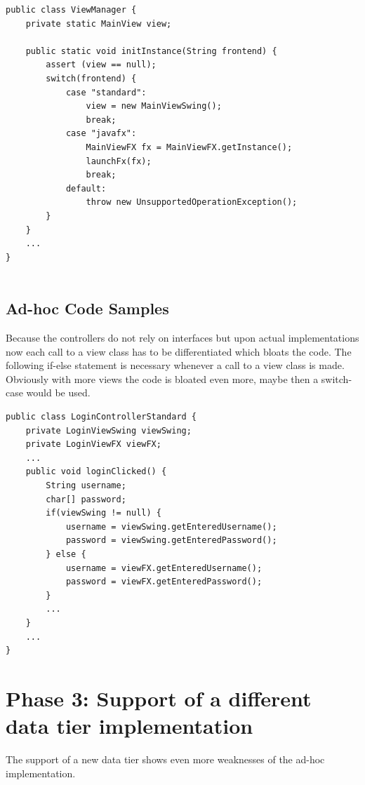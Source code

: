\begin{lstlisting}[caption={View Manager after implementation of a second GUI. Only a case branch has to be added.}, captionpos=b]
public class ViewManager {
	private static MainView view;
	
	public static void initInstance(String frontend) {
		assert (view == null);
		switch(frontend) {
			case "standard":
				view = new MainViewSwing();
				break;
			case "javafx":
				MainViewFX fx = MainViewFX.getInstance();
				launchFx(fx);
				break;
			default:
				throw new UnsupportedOperationException();
		}
	}
	...
}
	
\end{lstlisting}

\subsection{Ad-hoc Code Samples}
\label{sec:ad-hoc-javafx}
Because the controllers do not rely on interfaces but upon actual implementations now each call to a view class has to be differentiated which bloats the code. The following if-else statement is necessary whenever a call to a view class is made. Obviously with more views the code is bloated even more, maybe then a switch-case would be used.

\begin{lstlisting}[caption={[Code snipped showing login-code after implementing a second GUI.]Code snipped showing login-code after implementing a second GUI. Because no interface but concrete implementations are used each time a view access is needed the program is required to check for which of the two GUIs is currently active. Controller methods of the best pratice version do not change in any way.}, captionpos=b, label={lst:controller-switch}]
public class LoginControllerStandard {
	private LoginViewSwing viewSwing;
	private LoginViewFX viewFX;
	...
	public void loginClicked() {
		String username;
		char[] password;
		if(viewSwing != null) {
			username = viewSwing.getEnteredUsername();
			password = viewSwing.getEnteredPassword();
		} else {
			username = viewFX.getEnteredUsername();
			password = viewFX.getEnteredPassword();
		}
		...
	}
	...
}
\end{lstlisting}

\clearpage
\section{Phase 3: Support of a different data tier implementation}
The support of a new data tier shows even more weaknesses of the ad-hoc implementation.


